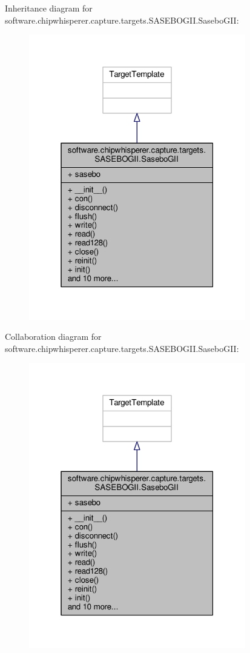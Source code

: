 Inheritance diagram for software.\+chipwhisperer.\+capture.\+targets.\+S\+A\+S\+E\+B\+O\+G\+I\+I.\+Sasebo\+G\+I\+I\+:\nopagebreak
\begin{figure}[H]
\begin{center}
\leavevmode
\includegraphics[width=268pt]{de/d77/classsoftware_1_1chipwhisperer_1_1capture_1_1targets_1_1SASEBOGII_1_1SaseboGII__inherit__graph}
\end{center}
\end{figure}


Collaboration diagram for software.\+chipwhisperer.\+capture.\+targets.\+S\+A\+S\+E\+B\+O\+G\+I\+I.\+Sasebo\+G\+I\+I\+:\nopagebreak
\begin{figure}[H]
\begin{center}
\leavevmode
\includegraphics[width=268pt]{d9/de5/classsoftware_1_1chipwhisperer_1_1capture_1_1targets_1_1SASEBOGII_1_1SaseboGII__coll__graph}
\end{center}
\end{figure}


